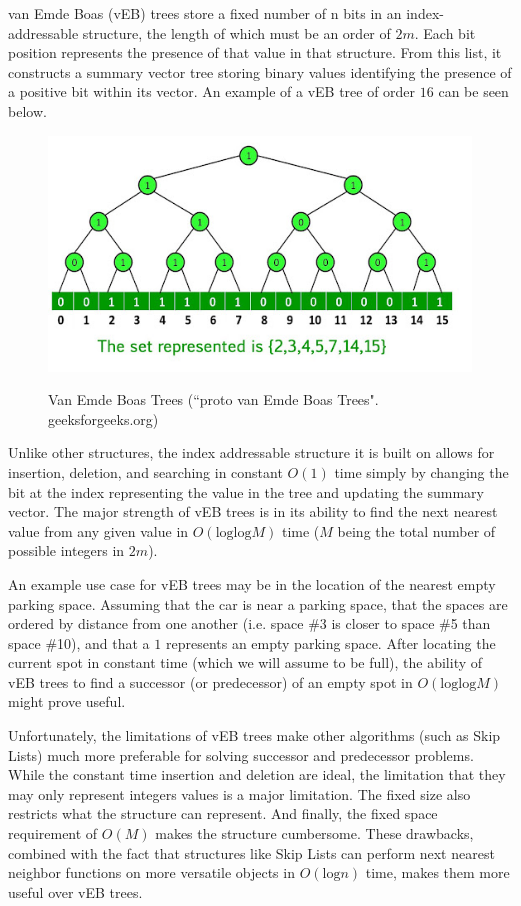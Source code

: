 \documentclass{article}
\begin{document}
van Emde Boas (vEB) trees store a fixed number of n bits in an index-addressable structure, the length of which must be an order of $2m$. Each bit position represents the presence of that value in that structure. From this list, it constructs a summary vector tree storing binary values identifying the presence of a positive bit within its vector. An example of a vEB tree of order $16$ can be seen below.

\begin{figure}[h]
    \centering
    \includegraphics[scale=0.5,keepaspectratio]{Images/vebtree.jpg}
    \label{fig:my_label}
    \caption{Van Emde Boas Trees (``proto van Emde Boas Trees". geeksforgeeks.org)}
\end{figure}

Unlike other structures, the index addressable structure it is built on allows for insertion, deletion, and searching in constant $O(1)$ time simply by changing the bit at the index representing the value in the tree and updating the summary vector. The major strength of vEB trees is in its ability to find the next nearest value from any given value in $O(\text{log}\text{log} M)$ time ($M$ being the total number of possible integers in $2m$).

An example use case for vEB trees may be in the location of the nearest empty parking space. Assuming that the car is near a parking space, that the spaces are ordered by distance from one another (i.e. space \#3 is closer to space \#5 than space \#10), and that a $1$ represents an empty parking space. After locating the current spot in constant time (which we will assume to be full), the ability of vEB trees to find a successor (or predecessor) of an empty spot in $O(\text{log}\text{log} M)$ might prove useful.

Unfortunately, the limitations of vEB trees make other algorithms (such as Skip Lists) much more preferable for solving successor and predecessor problems. While the constant time insertion and deletion are ideal, the limitation that they may only represent integers values is a major limitation. The fixed size also restricts what the structure can represent. And finally, the fixed space requirement of $O(M)$ makes the structure cumbersome. These drawbacks, combined with the fact that structures like Skip Lists can perform next nearest neighbor functions on more versatile objects in $O(\text{log} n)$ time, makes them more useful over vEB trees.
\end{document}
